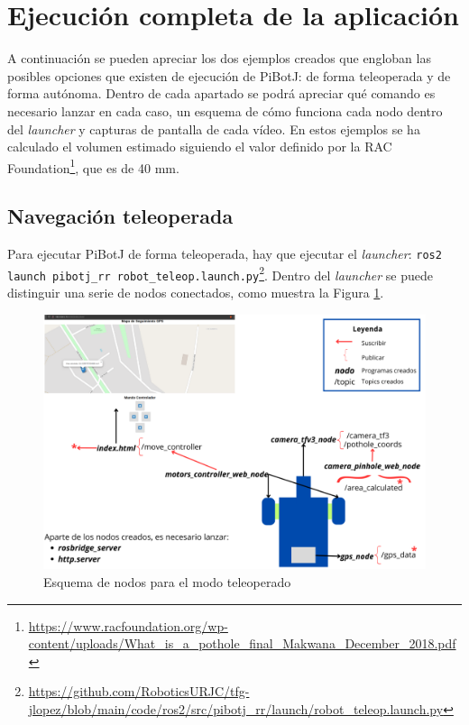 \section{Ejecución completa de la aplicación}
\label{sec:expcompleto}
A continuación se pueden apreciar los dos ejemplos creados que engloban las posibles opciones que existen de ejecución de PiBotJ: de forma teleoperada y de forma autónoma. Dentro de cada apartado se podrá apreciar qué comando es necesario lanzar en cada caso, un esquema de cómo funciona cada nodo dentro del \textit{launcher} y capturas de pantalla de cada vídeo. En estos ejemplos se ha calculado el volumen estimado siguiendo el valor definido por la RAC Foundation\footnote{\url{https://www.racfoundation.org/wp-content/uploads/What_is_a_pothole_final_Makwana_December_2018.pdf}}, que es de 40 mm. 

\subsection{Navegación teleoperada}

Para ejecutar PiBotJ de forma teleoperada, hay que ejecutar el \textit{launcher}: \verb|ros2 launch pibotj_rr robot_teleop.launch.py|\footnote{\url{https://github.com/RoboticsURJC/tfg-jlopez/blob/main/code/ros2/src/pibotj_rr/launch/robot_teleop.launch.py}}. Dentro del \textit{launcher} se puede distinguir una serie de nodos conectados, como muestra la Figura \ref{fig:nodosteleop}. 

\begin{figure} [h!]
	\begin{center}
			\includegraphics[width=15cm]{figs/cap7/esquema_nodos_teleop_ampliado.png}
		\end{center}
	\caption{Esquema de nodos para el modo teleoperado}
	\label{fig:nodosteleop}
\end{figure}
 
